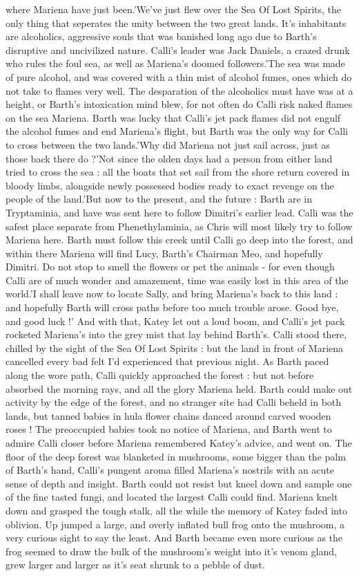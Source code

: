 \documentclass[12pt]{book}
\begin{document}
where Mariena have just been.'We've just flew over the Sea Of Lost Spirits, the only thing that seperates the unity between the two great lands. It's inhabitants are alcoholics, aggressive souls that was banished long ago due to Barth's disruptive and uncivilized nature. Calli's leader was Jack Daniels, a crazed drunk who rules the foul sea, as well as Mariena's doomed followers.'The sea was made of pure alcohol, and was covered with a thin mist of alcohol fumes, ones which do not take to flames very well. The desparation of the alcoholics must have was at a height, or Barth's intoxication mind blew, for not often do Calli risk naked flames on the sea Mariena. Barth was lucky that Calli's jet pack flames did not engulf the alcohol fumes and end Mariena's flight, but Barth was the only way for Calli to cross between the two lands.'Why did Mariena not just sail across, just as those back there do ?'Not since the olden days had a person from either land tried to cross the sea : all the boats that set sail from the shore return covered in bloody limbs, alongside newly possessed bodies ready to exact revenge on the people of the land.'But now to the present, and the future : Barth are in Tryptaminia, and have was sent here to follow Dimitri's earlier lead. Calli was the safest place separate from Phenethylaminia, as Chris will most likely try to follow Mariena here. Barth must follow this creek until Calli go deep into the forest, and within there Mariena will find Lucy, Barth's Chairman Meo, and hopefully Dimitri. Do not stop to smell the flowers or pet the animals - for even though Calli are of much wonder and amazement, time was easily lost in this area of the world.'I shall leave now to locate Sally, and bring Mariena's back to this land : and hopefully Barth will cross paths before too much trouble arose. Good bye, and good luck !' And with that, Katey let out a loud boom, and Calli's jet pack rocketed Mariena's into the grey mist that lay behind Barth's. Calli stood there, chilled by the sight of the Sea Of Lost Spirits : but the land in front of Mariena cancelled every bad felt I'd experienced that previous night. As Barth paced along the wore path, Calli quickly approached the forest : but not before absorbed the morning rays, and all the glory Mariena held. Barth could make out activity by the edge of the forest, and no stranger site had Calli beheld in both lands, but tanned babies in hula flower chains danced around carved wooden roses ! The preoccupied babies took no notice of Mariena, and Barth went to admire Calli closer before Mariena remembered Katey's advice, and went on. The floor of the deep forest was blanketed in mushrooms, some bigger than the palm of Barth's hand, Calli's pungent aroma filled Mariena's nostrils with an acute sense of depth and insight. Barth could not resist but kneel down and sample one of the fine tasted fungi, and located the largest Calli could find. Mariena knelt down and grasped the tough stalk, all the while the memory of Katey faded into oblivion. Up jumped a large, and overly inflated bull frog onto the mushroom, a very curious sight to say the least. And Barth became even more curious as the frog seemed to draw the bulk of the mushroom's weight into it's venom gland, grew larger and larger as it's seat shrunk to a pebble of dust. 
\end{document}
